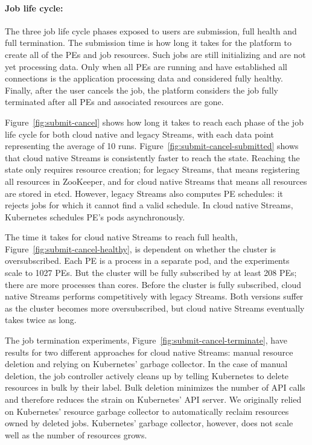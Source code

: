 \paragraph{Job life cycle:}
\label{sec:results:job-submission-termination}

The three job life cycle phases exposed to users are submission, full health
and full termination. The submission time is how long it takes for the
platform to create all of the PEs and job resources. Such jobs are still
initializing and are not yet processing data. Only when all PEs are running and
have established all connections is the application processing data and
considered fully healthy. Finally, after the user cancels the job, the platform
considers the job fully terminated after all PEs and associated resources are
gone.

Figure~\ref{fig:submit-cancel} shows how long it takes to reach each phase of
the job life cycle for both cloud native and legacy Streams, with each data
point representing the average of 10 runs.
Figure~\ref{fig:submit-cancel-submitted} shows that cloud native Streams is
consistently faster to reach the  state. Reaching the
 state only requires resource creation; for legacy Streams, that
means registering all resources in ZooKeeper, and for cloud native Streams that
means all resources are stored in etcd. However, legacy Streams also
computes PE schedules: it rejects jobs for which it cannot find a valid
schedule. In cloud native Streams, Kubernetes schedules PE’s pods asynchronously.

The time it takes for cloud native Streams to reach full health,
Figure~\ref{fig:submit-cancel-healthy}, is dependent on whether the
cluster is oversubscribed. Each PE is a process in a separate pod, and the
experiments scale to 1027 PEs. But the cluster will be fully subscribed by at least
208 PEs; there are more processes than cores. Before the cluster is
fully subscribed, cloud native Streams performs competitively with legacy
Streams. Both versions suffer as the cluster becomes more oversubscribed, but
cloud native Streams eventually takes twice as long.

The job termination experiments, Figure~\ref{fig:submit-cancel-terminate}, have
results for two different approaches for cloud native Streams: manual resource
deletion and relying on Kubernetes' garbage collector. In the case of manual
deletion, the job controller actively cleans up by telling Kubernetes to delete
resources in bulk by their label. Bulk deletion minimizes the number of API calls
and therefore reduces the strain on Kubernetes' API server. We originally relied
on Kubernetes' resource garbage collector to automatically reclaim resources
owned by deleted jobs. Kubernetes' garbage collector, however, does not scale
well as the number of resources grows.

